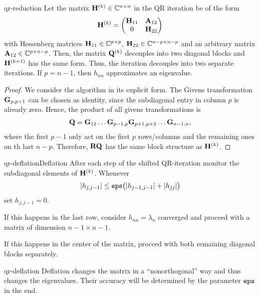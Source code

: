 \begin{Theorem}{qr-reduction}
  Let the matrix $\mathbf H^{(k)}\in\mathbb C^{n\times n}$ in the QR iteration be of the
  form
  \begin{gather}
    \mathbf H^{(k)} =
    \begin{pmatrix}
      \mathbf H_{11} & \mathbf A_{12}\\0 & \mathbf H_{22}
    \end{pmatrix}
  \end{gather}
  with Hessenberg matrices $\mathbf H_{11}\in\mathbb C^{p\times p}$,
  $\mathbf H_{22}\in \mathbb C^{n-p\times n-p}$ and an arbitrary matrix
  $\mathbf A_{12}\in \mathbb C^{p\times n-p}$. Then, the matrix $\mathbf Q^{(k)}$
  decouples into two diagonal blocks and $\mathbf H^{(k+1)}$ has the same
  form. Thus, the iteration decouples into two separate iterations. If
  $p=n-1$, then $h_{nn}$ approximates an eigenvalue.
\end{Theorem}

\begin{proof}
  We consider the algorithm in its explicit form.  The Givens
  transformation $\mathbf G_{p,p+1}$ can be chosen as identity, since
  the subdiagonal entry in column $p$ is already zero. Hence, the
  product of all givens transformations is
  \begin{gather}
    \mathbf Q = \mathbf G_{12}\dots\mathbf G_{p-1,p}\mathbf G_{p+1,p+2}\dots\mathbf G_{n-1,n},
  \end{gather}
  where the first $p-1$ only act on the first $p$ rows/columns and the
  remaining ones on th last $n-p$. Therefore, $\mathbf R\mathbf Q$ has the
  same block structure as $\mathbf H^{(k)}$.
\end{proof}


\begin{Algorithm*}{qr-deflation}{Deflation}
  After each step of the shifted QR-iteration monitor the subdiagonal
  elements of $\mathbf H^{(k)}$. Whenever
  \begin{gather}
    \lvert h_{j,j-1}\rvert \le \texttt{eps} \bigl(\lvert h_{j-1,j-1}\rvert+\lvert h_{jj}\rvert\bigr)
  \end{gather}
  set $h_{j,j-1}=0$.

  If this happens in the last row, consider $h_{nn}=\lambda_n$
  converged and proceed with a matrix of dimension $n-1\times n-1$.

  If this happens in the center of the matrix, proceed with both
  remaining diagonal blocks separately.

\end{Algorithm*}

\begin{Remark}{qr-deflation}
  Deflation changes the matrix in a ``nonorthogonal'' way and thus
  changes the eigenvalues. Their accuracy will be determined by the
  parameter $\texttt{eps}$ in the end.
\end{Remark}

